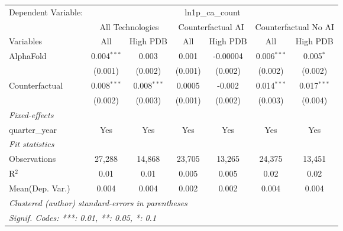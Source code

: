 \begingroup
\centering
\begin{tabular}{lcccccc}
   \tabularnewline \midrule \midrule
   Dependent Variable: & \multicolumn{6}{c}{ln1p\_ca\_count}\\
 & \multicolumn{2}{c}{All Technologies} & \multicolumn{2}{c}{Counterfactual AI} & \multicolumn{2}{c}{Counterfactual No AI} \\
\cmidrule(lr){1-1}\cmidrule(lr){2-3} \cmidrule(lr){4-5} \cmidrule(lr){6-7}
Variables & \multicolumn{1}{c}{All} & \multicolumn{1}{c}{High PDB} & \multicolumn{1}{c}{All} & \multicolumn{1}{c}{High PDB} & \multicolumn{1}{c}{All} & \multicolumn{1}{c}{High PDB} \\
\cmidrule(lr){1-1}\cmidrule(lr){2-2} \cmidrule(lr){3-3} \cmidrule(lr){4-4} \cmidrule(lr){5-5} \cmidrule(lr){6-6} \cmidrule(lr){7-7}
   AlphaFold      & 0.004$^{***}$ & 0.003         & 0.001   & -0.00004 & 0.006$^{***}$ & 0.005$^{*}$\\   
                  & (0.001)       & (0.002)       & (0.001) & (0.002)  & (0.002)       & (0.002)\\   
   Counterfactual & 0.008$^{***}$ & 0.008$^{***}$ & 0.0005  & -0.002   & 0.014$^{***}$ & 0.017$^{***}$\\   
                  & (0.002)       & (0.003)       & (0.001) & (0.002)  & (0.003)       & (0.004)\\   
   \midrule
   \emph{Fixed-effects}\\
   quarter\_year  & Yes           & Yes           & Yes     & Yes      & Yes           & Yes\\  
   \midrule
   \emph{Fit statistics}\\
   Observations   & 27,288        & 14,868        & 23,705  & 13,265   & 24,375        & 13,451\\  
   R$^2$          & 0.01          & 0.01          & 0.005   & 0.005    & 0.02          & 0.02\\  
Mean(Dep. Var.) & 0.004 & 0.004 & 0.002 & 0.002 & 0.004 & 0.004 \\
   \midrule \midrule
   \multicolumn{7}{l}{\emph{Clustered (author) standard-errors in parentheses}}\\
   \multicolumn{7}{l}{\emph{Signif. Codes: ***: 0.01, **: 0.05, *: 0.1}}\\
\end{tabular}
\par\endgroup
